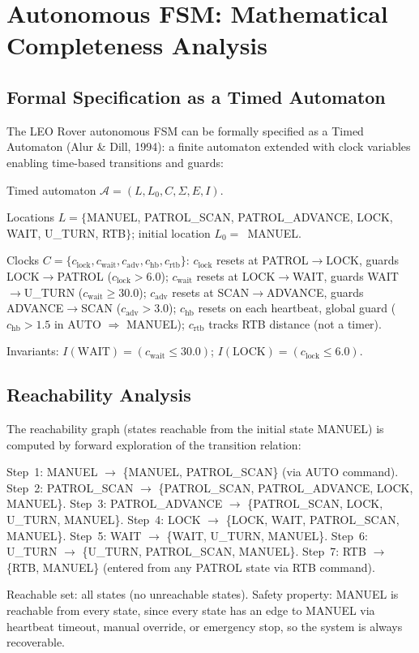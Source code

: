 \section{Autonomous FSM: Mathematical Completeness Analysis}

\subsection{Formal Specification as a Timed Automaton}

The LEO Rover autonomous FSM can be formally specified as a Timed Automaton (Alur \& Dill, 1994): a finite automaton extended with clock variables enabling time-based transitions and guards:

\begin{eqblock}
Timed automaton $\mathcal{A} = (L, L_0, C, \Sigma, E, I)$.

Locations $L = \{$MANUEL, PATROL\_SCAN, PATROL\_ADVANCE, LOCK, WAIT, U\_TURN, RTB$\}$; initial location $L_0=$~MANUEL.

Clocks $C = \{c_{\text{lock}}, c_{\text{wait}}, c_{\text{adv}}, c_{\text{hb}}, c_{\text{rtb}}\}$: $c_{\text{lock}}$ resets at PATROL$\to$LOCK, guards LOCK$\to$PATROL ($c_{\text{lock}}>6.0$); $c_{\text{wait}}$ resets at LOCK$\to$WAIT, guards WAIT$\to$U\_TURN ($c_{\text{wait}}\geq30.0$); $c_{\text{adv}}$ resets at SCAN$\to$ADVANCE, guards ADVANCE$\to$SCAN ($c_{\text{adv}}>3.0$); $c_{\text{hb}}$ resets on each heartbeat, global guard ($c_{\text{hb}}>1.5$ in AUTO $\Rightarrow$ MANUEL); $c_{\text{rtb}}$ tracks RTB distance (not a timer).

Invariants: $I(\text{WAIT}) = (c_{\text{wait}}\leq30.0)$; $I(\text{LOCK}) = (c_{\text{lock}}\leq6.0)$.
\end{eqblock}

\subsection{Reachability Analysis}

The reachability graph (states reachable from the initial state MANUEL) is computed by forward exploration of the transition relation:

\begin{eqblock}
Step~1: MANUEL $\to$ \{MANUEL, PATROL\_SCAN\} (via AUTO command). Step~2: PATROL\_SCAN $\to$ \{PATROL\_SCAN, PATROL\_ADVANCE, LOCK, MANUEL\}. Step~3: PATROL\_ADVANCE $\to$ \{PATROL\_SCAN, LOCK, U\_TURN, MANUEL\}. Step~4: LOCK $\to$ \{LOCK, WAIT, PATROL\_SCAN, MANUEL\}. Step~5: WAIT $\to$ \{WAIT, U\_TURN, MANUEL\}. Step~6: U\_TURN $\to$ \{U\_TURN, PATROL\_SCAN, MANUEL\}. Step~7: RTB $\to$ \{RTB, MANUEL\} (entered from any PATROL state via RTB command).

Reachable set: all states (no unreachable states). Safety property: MANUEL is reachable from every state, since every state has an edge to MANUEL via heartbeat timeout, manual override, or emergency stop, so the system is always recoverable.
\end{eqblock}

